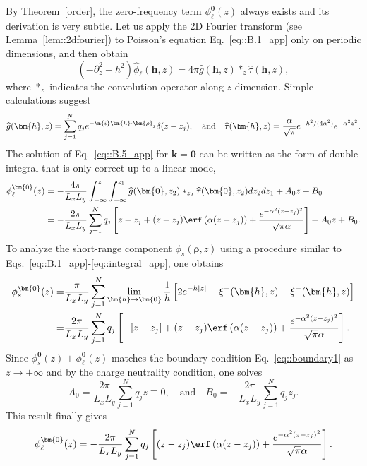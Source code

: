By Theorem~\ref{order}, the zero-frequency term $\phi^{\bm{0}}_{\ell}(z)$ always exists and its derivation is very subtle. Let us apply the 2D Fourier transform (see Lemma~\ref{lem::2dfourier}) to Poisson's equation Eq.~\eqref{eq::B.1_app} only on periodic dimensions, and then obtain
\begin{equation}\label{eq::B.5_app}
	(-\partial_z^2+h^2)\widehat{\phi}_{\ell}(\bm{h},z)=4\pi\widehat{g}(\bm{h},z)\ast_{z}\widehat{\tau}(\bm{h},z),
\end{equation}
where $\ast_z$ indicates the convolution operator along $z$ dimension. Simple calculations suggest
\begin{equation}
	\widehat{g}(\bm{h},z)=\sum_{j=1}^{N}q_{j} e^{-\m{i} \bm{h}\cdot\bm{\rho}_{j}}\delta(z-z_{j}),\quad\text{and}\quad \widehat{\tau}(\bm{h},z)=\frac{\alpha}{\sqrt{\pi}} e^{-h^2/(4\alpha^2)}e^{-\alpha^2z^2}.
\end{equation}
The solution of Eq.~\eqref{eq::B.5_app} for $\bm{k}=\bm{0}$ can be written as the form of double integral that is only correct up to a linear mode,
\begin{equation}\begin{split}
		\phi_{\ell}^{\bm{0}}(z)&=-\frac{4\pi}{L_xL_y}\int_{-\infty}^{z}\int_{-\infty}^{z_1}\widehat{g}(\bm{0},z_2)\ast_{z_2}\widehat{\tau}(\bm{0},z_2)dz_2dz_1+A_0z+B_0\\
		&=-\frac{2\pi}{L_xL_y}\sum_{j=1}^{N}q_{j}\left[z-z_{j}+(z-z_{j})\erf\left(\alpha(z-z_{j})\right)+\frac{e^{-\alpha^2(z-z_{j})^2}}{\sqrt{\pi}\alpha}\right]+A_0z+B_0.
	\end{split}
\end{equation}
To analyze the short-range component $\phi_{s}(\bm{\rho},z)$ using a procedure similar to Eqs.~\eqref{eq::B.1_app}-\eqref{eq::integral_app}, one obtains
\begin{equation}\begin{split}
		\phi_{s}^{\bm{0}}(z) =& \frac{\pi}{L_x L_y} \sum_{j=1}^{N} \lim_{\bm{h}\rightarrow\bm{0}} \frac{1}{h} \left[2e^{-h|z|}-\xi^{+}(\bm{h},z) - \xi^{-}(\bm{h},z)\right]\\
		=& \frac{2\pi}{L_xL_y}\sum_{j=1}^{N}q_{j}\left[-|z-z_{j}|+(z-z_{j})\erf\left(\alpha(z-z_{j})\right)+\frac{e^{-\alpha^2(z-z_{j})^2}}{\sqrt{\pi}\alpha}\right].
	\end{split}
\end{equation}
Since $\phi_{s}^{\bm{0}}(z)+\phi_{\ell}^{\bm{0}}(z)$ matches the boundary condition Eq.~\eqref{eq::boundary1} as $z\rightarrow \pm\infty$ and by the charge neutrality condition, one solves 
\begin{equation}
	A_0 = \frac{2\pi}{L_xL_y}\sum_{j=1}^{N}q_{j}z \equiv 0,\quad \text{and}\quad B_0=-\frac{2\pi}{L_xL_y}\sum_{j=1}^{N}q_{j}z_{j}.
\end{equation}
This result finally gives 
\begin{equation}
	\phi_{\ell}^{\bm{0}}(z)=-\frac{2\pi}{L_xL_y}\sum_{j=1}^{N}q_{j}\left[(z-z_{j})\erf\left(\alpha(z-z_{j})\right)+\frac{e^{-\alpha^2(z-z_{j})^2}}{\sqrt{\pi}\alpha}\right].
\end{equation}

